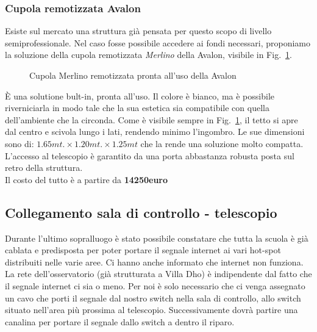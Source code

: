 \documentclass[a4paper,12pt]{article}
\begin{document}
\subsubsection{Cupola remotizzata Avalon}
Esiste sul mercato una struttura gi\`a pensata per questo scopo di livello semiprofessionale. Nel caso fosse possibile accedere ai fondi necessari, proponiamo la soluzione della cupola remotizzata \textit{Merlino} della Avalon, visibile in Fig.~\ref{MERLINO}.
\begin{figure}[H]
	\centering
	\caption{Cupola Merlino remotizzata pronta all'uso della Avalon}
	\label{MERLINO}
\end{figure}
\`E una solutione bult-in, pronta all'uso. Il colore \`e bianco, ma \`e possibile riverniciarla in modo tale che la sua estetica sia compatibile con quella dell'ambiente che la circonda. Come \`e visibile sempre in Fig.~\ref{MERLINO}, il tetto si apre dal centro e scivola lungo i lati, rendendo minimo l'ingombro. Le sue dimensioni sono di: $1.65 mt. \times 1.20 mt. \times 1.25 mt$ che la rende una soluzione molto compatta. L'accesso al telescopio \`e garantito da una porta abbastanza robusta posta sul retro della struttura.
\\
Il costo del tutto \`e a partire da \textbf{14250euro} 

\subsection{Collegamento sala di controllo - telescopio}
Durante l'ultimo sopralluogo \`e stato possibile constatare che tutta la scuola \`e gi\`a cablata e predisposta per poter portare il segnale internet ai vari hot-spot distribuiti nelle varie aree. Ci hanno anche informato che internet non funziona. La rete dell'osservatorio (gi\`a strutturata a Villa Dho) \`e indipendente dal fatto che il segnale  internet ci sia o meno. Per noi \`e solo necessario che ci venga assegnato un cavo che porti il segnale dal nostro switch nella sala di controllo, allo switch situato nell'area pi\`u prossima al telescopio. Successivamente dovr\`a partire una canalina per portare il segnale dallo switch a dentro il riparo.
\end{document}
